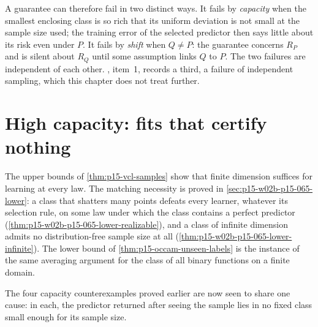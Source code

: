 A guarantee can therefore fail in two distinct ways. It fails by
\emph{capacity} when the smallest enclosing class is so rich that its
uniform deviation is not small at the sample size used; the training
error of the selected predictor then says little about its risk even
under \(P\). It fails by \emph{shift} when \(Q\neq P\): the guarantee
concerns \(R_P\) and is silent about \(R_Q\) until some assumption
links \(Q\) to \(P\). The two failures are independent of each other.
, item~1, records a third, a failure of
independent sampling, which this chapter does not treat further.

\section{High capacity: fits that certify nothing}
\label{sec:p15-w02b-p15-066-capacity}

The upper bounds of \cref{thm:p15-vcl-samples} show that finite
dimension suffices for learning at every law. The matching necessity is
proved in \cref{sec:p15-w02b-p15-065-lower}: a class that shatters many
points defeats every learner, whatever its selection rule, on some law
under which the class contains a perfect predictor
(\cref{thm:p15-w02b-p15-065-lower-realizable}), and a class of infinite
dimension admits no distribution-free sample size at all
(\cref{thm:p15-w02b-p15-065-lower-infinite}). The lower bound of
\cref{thm:p15-occam-unseen-labels} is the instance of the same averaging
argument for the class of all binary functions on a finite domain.

The four capacity counterexamples proved earlier are now seen to share
one cause: in each, the predictor returned after seeing the sample lies
in no fixed class small enough for its sample size.

